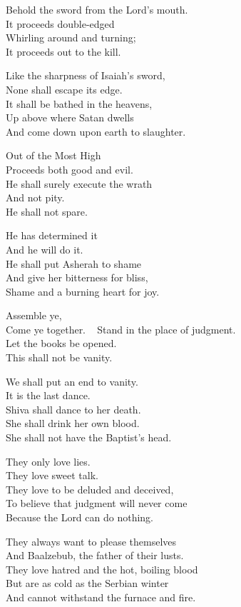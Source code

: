 \documentclass[
]{book}
\begin{document}
Behold the sword from the Lord's mouth.\\
It proceeds double-edged\\
Whirling around and turning;\\
It proceeds out to the kill.

Like the sharpness of Isaiah's sword,\\
None shall escape its edge.\\
It shall be bathed in the heavens,\\
Up above where Satan dwells\\
And come down upon earth to slaughter.

Out of the Most High\\
Proceeds both good and evil.\\
He shall surely execute the wrath\\
And not pity.\\
He shall not spare.

He has determined it\\
And he will do it.\\
He shall put Asherah to shame\\
And give her bitterness for bliss,\\
Shame and a burning heart for joy.

Assemble ye,\\
Come ye together. ~
Stand in the place of judgment.\\
Let the books be opened.\\
This shall not be vanity.

We shall put an end to vanity.\\
It is the last dance.\\
Shiva shall dance to her death.\\
She shall drink her own blood.\\
She shall not have the Baptist's head.

They only love lies.\\
They love sweet talk.\\
They love to be deluded and deceived,\\
To believe that judgment will never come\\
Because the Lord can do nothing.

They always want to please themselves\\
And Baalzebub, the father of their lusts.\\
They love hatred and the hot, boiling blood\\
But are as cold as the Serbian winter\\
And cannot withstand the furnace and fire.
\end{document}
